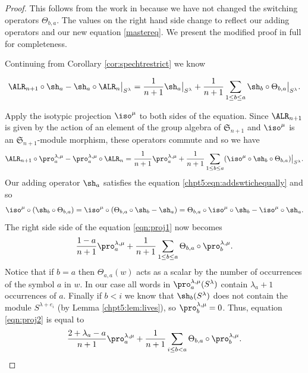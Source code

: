 \documentclass[11pt]{report}
\begin{document}
\begin{proof}
	This follows from the work in \cite{dieker2018spectral} because we 
	have not changed the switching operators $\Theta_{b,a}$.  The values on 
	the right hand side change to reflect our adding operators and our new equation \eqref{mastereq}. We present the modified proof in full for completeness.
	
	Continuing from Corollary \ref{cor:spechtrestrict} we know
	
	\[ \ALR_{n+1} \circ \sh_{a} - \sh_{a} \circ \ALR_{n}\big|_{S^{\lambda}} 
	= 
	\frac{1}{n+1}\sh_{a}\big|_{S^{\lambda}} + \frac{1}{n+1}\sum_{1 \leq b 
		\leq a} \sh_{b}\circ\Theta_{b,a}\big|_{S^{\lambda}}.\]
	
	Apply the isotypic projection $\iso^{\mu}$ to both sides of 
	the equation.	Since $\ALR_{n+1}$ is given by the action of an element 
	of 
	the group algebra of $\mathfrak{S}_{n+1}$ and $\iso^{\mu}$ is an 
	$\mathfrak{S}_{n+1}$-module morphism, these operators commute and so we 
	have
	\begin{eqnarray}
	\ALR_{n+1} \circ \pro_{a}^{\lambda,\mu} - 
	\pro_{a}^{\lambda,\mu} \circ \ALR_{n} = 
	\frac{1}{n+1}\pro_{a}^{\lambda,\mu} +  
	\frac{1}{n+1}\sum_{1 \leq b \leq a}(\iso^{\mu} 
	\circ \sh_{b}\circ\Theta_{b,a})\big|_{S^{\lambda}}. 
	\label{eqn:proj1}
	\end{eqnarray}
	Our adding operator $\sh_{a}$ satisfies the equation
	\eqref{chpt5:eqn:addswtichequally} 
	and so
	\[\iso^{\mu} \circ \left(\sh_{b}\circ\Theta_{b,a} \right) = \iso^{\mu} 
	\circ \left(\Theta_{b,a} \circ \sh_{b} -\sh_{a} \right)
	= \Theta_{b,a} \circ \iso^{\mu} \circ \sh_{b} - 
	\iso^{\mu} \circ \sh_{a} .\]
	The right side side of the equation \eqref{eqn:proj1} now becomes
	\begin{eqnarray}
	\frac{1-a}{n+1}\pro_{a}^{\lambda,\mu} +  
	\frac{1}{n+1}\sum_{1 \leq b \leq a} \Theta_{b,a} \circ 
	\pro_{b}^{\lambda,\mu} . \label{eqn:proj2}
	\end{eqnarray}
	Notice that if $b=a$ then 
	$\Theta_{a,a}(w)$ acts as a scalar by the number of occurrences of the 
	symbol $a$ in $w$. In our case all words in 
	$\pro_{a}^{\lambda,\mu}(S^{\lambda})$ contain $\lambda_{a}+1$ 
	occurrences of $a$. Finally if $b<i$ we know that $\sh_{b}(S^{\lambda})$ does not contain the module $S^{\lambda+e_{i}}$ (by Lemma \ref{chpt5:lem:lives}), so $\pro_{b}^{\lambda,\mu}=0$. Thus, equation \eqref{eqn:proj2} is equal to
	\[	\frac{2+\lambda_{a}-a}{n+1}\pro_{a}^{\lambda,\mu} +  
	\frac{1}{n+1}\sum_{i \leq b < a} \Theta_{b,a} \circ 
	\pro_{b}^{\lambda,\mu} . \label{eqn:proj3} \qedhere \]
\end{proof}
\end{document}
